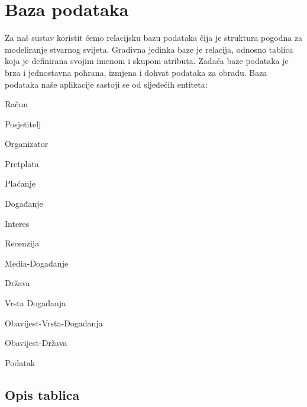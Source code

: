 	

	\pagebreak
				
		\section{Baza podataka}
			
			
		
		\textrm{Za naš sustav koristit ćemo relacijsku bazu podataka čija je struktura pogodna za modeliranje stvarnog svijeta. Gradivna jedinka baze je relacija, odnosno tablica koja je definirana svojim imenom i skupom atributa. Zadaća baze podataka je brza i jednostavna pohrana, izmjena i dohvat podataka za obradu. Baza podataka naše aplikacije sastoji se od sljedećih entiteta:}
		
	\begin{packed_item}
		
		\item Račun
		\item Posjetitelj
		\item Organizator
		\item Pretplata
		\item Plaćanje
		\item Događanje
		\item Interes
		\item Recenzija
		\item Media-Događanje
		\item Država
		\item Vrsta Događanja
		\item Obavijest-Vrsta-Događanja
		\item Obavijest-Država
		\item Podatak
	\end{packed_item}
		
		
			\subsection{Opis tablica}
					

			
